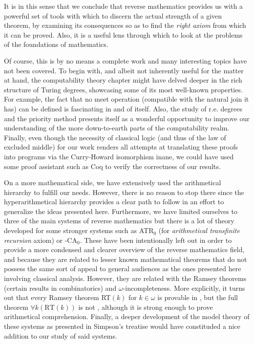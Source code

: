 \documentclass[../main.tex]{memoir}
\begin{document}
It is in this sense that we conclude that reverse mathematics provides us with a powerful set of tools with which to discern the actual strength of a given theorem, by examining its consequences so as to find the \textit{right axiom} from which it can be proved. Also, it is a useful lens through which to look at the problems of the foundations of mathematics.

Of course, this is by no means a complete work and many interesting topics have not been covered. To begin with, and albeit not inherently useful for the matter at hand, the computability theory chapter might have delved deeper in the rich structure of Turing degrees, showcasing some of its most well-known properties. For example, the fact that no meet operation (compatible with the natural join it has) can be defined is fascinating in and of itself. Also, the study of r.e. degrees and the priority method presents itself as a wonderful opportunity to improve our understanding of the more down-to-earth parts of the computability realm. Finally, even though the necessity of classical logic (and thus of the law of excluded middle) for our work renders all attempts at translating these proofs into programs via the Curry-Howard isomorphism inane, we could have used some proof assistant such as Coq to verify the correctness of our results.

On a more mathematical side, we have extensively used the arithmetical hierarchy to fulfill our needs. However, there is no reason to stop there since the hyperarithmetical hierarchy provides a clear path to follow in an effort to generalize the ideas presented here. Furthermore, we have limited ourselves to three of the main systems of reverse mathematics but there is a lot of theory developed for some stronger systems such as ATR$_0$ (for \textit{arithmetical transfinite recursion} axiom) or -CA$_0$. These have been intentionally left out in order to provide a more condensed and clearer overview of the reverse mathematics field, and because they are related to lesser known mathematical theorems that do not possess the same sort of appeal to general audiences as the ones presented here involving classical analysis. However, they are related with the Ramsey theorems (certain results in combinatorics) and $\omega$-incompleteness. More explicitly, it turns out that every Ramsey theorem RT$(k)$ for $k \in \omega$ is provable in \aca, but the full theorem $\forall k (\text{RT}(k))$ is not \cite{stillwell}, although it is strong enough to prove arithmetical comprehension. Finally, a deeper development of the model theory of these systems as presented in Simpson's treatise \cite{simpson} would have constituded a nice addition to our study of said systems.
\end{document}
